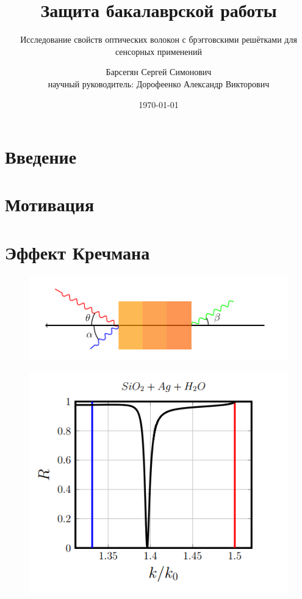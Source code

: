 \documentclass[t]{beamer}  %
\title{Защита бакалаврской работы}
\subtitle{Исследование свойств оптических волокон с брэгговскими решётками для сенсорных применений}
\author[]{Барсегян Сергей Симонович\\[10mm]{\small научный руководитель: Дорофеенко Александр Викторович}}
\date{\today}
\institute[]{Московский физико-технический институт \\ Национальный исследовательский университет}
\begin{document}
\frame[plain]{\titlepage}	%

\section{Введение}
\begin{frame}
	
	
\end{frame}	
\section{Мотивация}
\begin{frame}
	
\end{frame}	
\section{Эффект Кречмана}
\begin{frame}
	\begin{figure}[h]
		\centering
		\includegraphics[width=1.1\linewidth]{screenshot006}
		\caption{}
		\label{fig:screenshot006}
	\end{figure}
\end{frame}

\begin{frame}
	
	\begin{figure}[h]
		\centering
		\includegraphics[width=0.7\linewidth]{screenshot004}
		\caption{}
		\label{fig:screenshot004}
	\end{figure}
	
\end{frame}	
\end{document}
